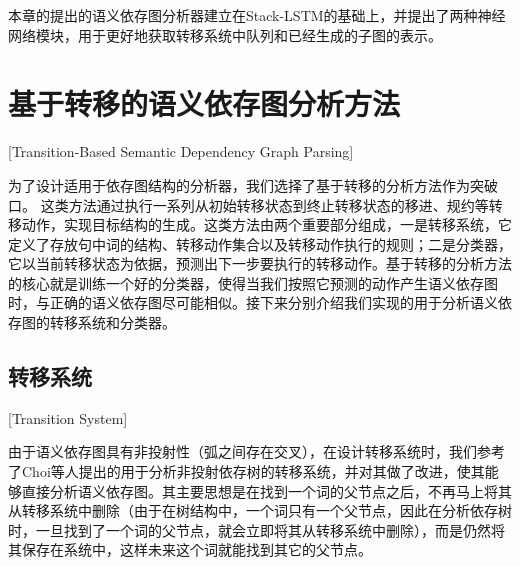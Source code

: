 本章的提出的语义依存图分析器建立在Stack-LSTM的基础上，并提出了两种神经网络模块，用于更好地获取转移系统中队列和已经生成的子图的表示。


\section{基于转移的语义依存图分析方法}[Transition-Based Semantic Dependency Graph Parsing]

为了设计适用于依存图结构的分析器，我们选择了基于转移的分析方法作为突破口。
这类方法通过执行一系列从初始转移状态到终止转移状态的移进、规约等转移动作，实现目标结构的生成。这类方法由两个重要部分组成，一是转移系统，它定义了存放句中词的结构、转移动作集合以及转移动作执行的规则；二是分类器，它以当前转移状态为依据，预测出下一步要执行的转移动作。基于转移的分析方法的核心就是训练一个好的分类器，使得当我们按照它预测的动作产生语义依存图时，与正确的语义依存图尽可能相似。接下来分别介绍我们实现的用于分析语义依存图的转移系统和分类器。

\subsection{转移系统}[Transition System]

由于语义依存图具有非投射性（弧之间存在交叉），在设计转移系统时，我们参考了Choi等人提出的用于分析非投射依存树的转移系统，\cite{choi-palmer:2011:ACL-HLT2011,choi-mccallum:2013:ACL2013}并对其做了改进，使其能够直接分析语义依存图。其主要思想是在找到一个词的父节点之后，不再马上将其从转移系统中删除（由于在树结构中，一个词只有一个父节点，因此在分析依存树时，一旦找到了一个词的父节点，就会立即将其从转移系统中删除），而是仍然将其保存在系统中，这样未来这个词就能找到其它的父节点。




